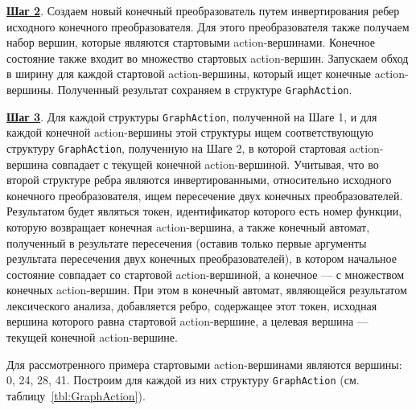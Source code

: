 \textbf{\underline{Шаг 2}}. Создаем новый конечный преобразователь путем инвертирования ребер исходного конечного преобразователя. Для этого преобразователя также получаем набор вершин, которые являются стартовыми action-вершинами. Конечное состояние также входит во множество стартовых action-вершин. Запускаем обход в ширину для каждой стартовой action-вершины, который ищет конечные action-вершины. Полученный результат сохраняем в структуре \verb|GraphAction|. 

\textbf{\underline{Шаг 3}}. Для каждой структуры \verb|GraphAction|, полученной на Шаге 1, и для каждой конечной  action-вершины этой структуры ищем соответствующую структуру \verb|GraphAction|, полученную на Шаге 2, в которой стартовая action-вершина совпадает с текущей конечной action-вершиной. Учитывая, что во второй структуре ребра являются инвертированными, относительно исходного конечного преобразователя, ищем пересечение двух конечных преобразователей. Результатом будет являться токен, идентификатор которого есть номер функции, которую возвращает конечная action-вершина, а также конечный автомат, полученный в результате пересечения (оставив только первые аргументы результата пересечения двух конечных преобразователей), в котором начальное состояние совпадает со стартовой action-вершиной, а конечное --- с множеством конечных action-вершин. При этом в конечный автомат, являющейся результатом лексического анализа, добавляется ребро, содержащее этот токен, исходная вершина которого равна стартовой action-вершине, а целевая вершина --- текущей конечной action-вершине. 

Для рассмотренного примера стартовыми action-вершинами являются вершины: 0, 24, 28, 41. Построим для каждой из них структуру \verb|GraphAction| (см. таблицу~\ref{tbl:GraphAction}). 

